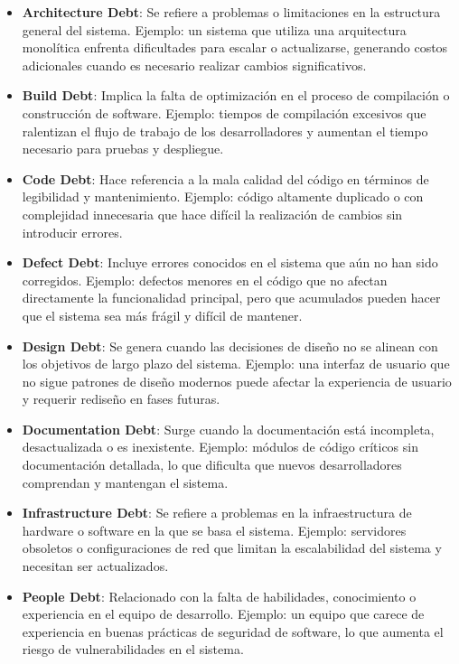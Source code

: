 \begin{itemize}
    \item \textbf{Architecture Debt}: Se refiere a problemas o limitaciones en la estructura general del sistema. Ejemplo: un sistema que utiliza una arquitectura monolítica enfrenta dificultades para escalar o actualizarse, generando costos adicionales cuando es necesario realizar cambios significativos.

    \item \textbf{Build Debt}: Implica la falta de optimización en el proceso de compilación o construcción de software. Ejemplo: tiempos de compilación excesivos que ralentizan el flujo de trabajo de los desarrolladores y aumentan el tiempo necesario para pruebas y despliegue.

    \item \textbf{Code Debt}: Hace referencia a la mala calidad del código en términos de legibilidad y mantenimiento. Ejemplo: código altamente duplicado o con complejidad innecesaria que hace difícil la realización de cambios sin introducir errores.

    \item \textbf{Defect Debt}: Incluye errores conocidos en el sistema que aún no han sido corregidos. Ejemplo: defectos menores en el código que no afectan directamente la funcionalidad principal, pero que acumulados pueden hacer que el sistema sea más frágil y difícil de mantener.

    \item \textbf{Design Debt}: Se genera cuando las decisiones de diseño no se alinean con los objetivos de largo plazo del sistema. Ejemplo: una interfaz de usuario que no sigue patrones de diseño modernos puede afectar la experiencia de usuario y requerir rediseño en fases futuras.

    \item \textbf{Documentation Debt}: Surge cuando la documentación está incompleta, desactualizada o es inexistente. Ejemplo: módulos de código críticos sin documentación detallada, lo que dificulta que nuevos desarrolladores comprendan y mantengan el sistema.

    \item \textbf{Infrastructure Debt}: Se refiere a problemas en la infraestructura de hardware o software en la que se basa el sistema. Ejemplo: servidores obsoletos o configuraciones de red que limitan la escalabilidad del sistema y necesitan ser actualizados.

    \item \textbf{People Debt}: Relacionado con la falta de habilidades, conocimiento o experiencia en el equipo de desarrollo. Ejemplo: un equipo que carece de experiencia en buenas prácticas de seguridad de software, lo que aumenta el riesgo de vulnerabilidades en el sistema.


\end{itemize}
